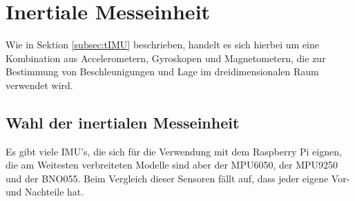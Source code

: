 \section{Inertiale Messeinheit}
\label{sec:IMU}
Wie in Sektion \ref{subsec:tIMU} beschrieben, handelt es sich hierbei um eine Kombination aus Accelerometern, Gyroskopen und Magnetometern, die zur Bestimmung von Beschleunigungen und Lage im dreidimensionalen Raum verwendet wird.
\subsection{Wahl der inertialen Messeinheit}
\label{subsec:IMUchoice}
Es gibt viele \ac{IMU}'s, die sich für die Verwendung mit dem Raspberry Pi eignen, die am Weitesten verbreiteten Modelle sind aber der MPU6050, der MPU9250 und der BNO055. Beim Vergleich dieser Sensoren fällt auf, dass jeder eigene Vor- und Nachteile hat. 

